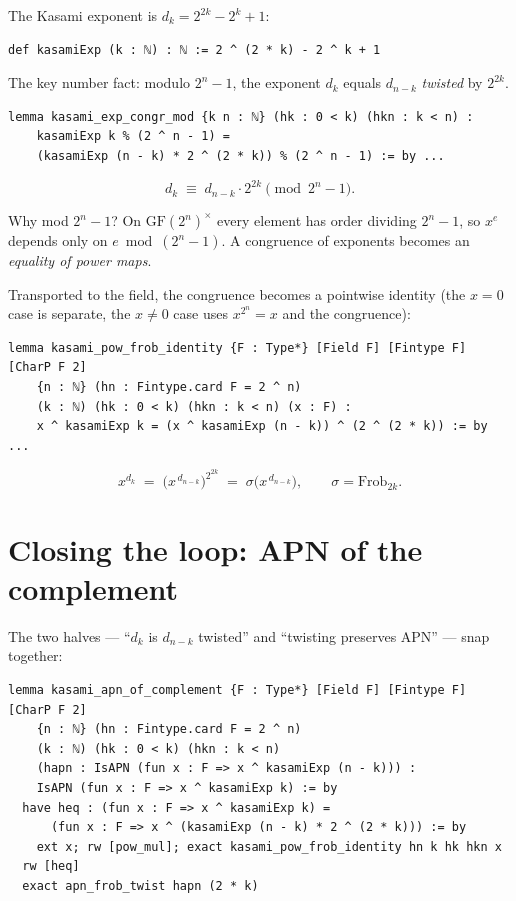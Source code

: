 \documentclass[11pt]{article}
\newcommand{\note}[1]{%
  \par\smallskip
  \noindent\colorbox{leanbg}{\parbox{\dimexpr\linewidth-2\fboxsep}{\small #1}}%
  \par\smallskip}
\begin{document}
The Kasami exponent is $d_k = 2^{2k} - 2^k + 1$:

\begin{lstlisting}
def kasamiExp (k : ℕ) : ℕ := 2 ^ (2 * k) - 2 ^ k + 1
\end{lstlisting}

\noindent
The key number fact: modulo $2^{n}-1$, the exponent $d_k$ equals
$d_{n-k}$ \emph{twisted} by $2^{2k}$.

\begin{lstlisting}
lemma kasami_exp_congr_mod {k n : ℕ} (hk : 0 < k) (hkn : k < n) :
    kasamiExp k % (2 ^ n - 1) =
    (kasamiExp (n - k) * 2 ^ (2 * k)) % (2 ^ n - 1) := by ...
\end{lstlisting}

\[
d_k \;\equiv\; d_{n-k}\cdot 2^{2k} \pmod{2^{n}-1}.
\]

\note{Why mod $2^{n}-1$? On $\mathrm{GF}(2^{n})^{\times}$ every element has order
dividing $2^{n}-1$, so $x^{e}$ depends only on $e \bmod (2^{n}-1)$.
A congruence of exponents becomes an \emph{equality of power maps}.}

\bigskip
\noindent
Transported to the field, the congruence becomes a pointwise identity
(the $x=0$ case is separate, the $x\ne 0$ case uses
$x^{2^{n}}=x$ and the congruence):

\begin{lstlisting}
lemma kasami_pow_frob_identity {F : Type*} [Field F] [Fintype F] [CharP F 2]
    {n : ℕ} (hn : Fintype.card F = 2 ^ n)
    (k : ℕ) (hk : 0 < k) (hkn : k < n) (x : F) :
    x ^ kasamiExp k = (x ^ kasamiExp (n - k)) ^ (2 ^ (2 * k)) := by ...
\end{lstlisting}

\[
x^{d_k} \;=\; \bigl(x^{\,d_{n-k}}\bigr)^{2^{2k}}
\;=\;
σ\bigl(x^{\,d_{n-k}}\bigr),\qquad σ = \text{Frob}_{2k}.
\]

\bigskip

\section{Closing the loop: APN of the complement}

The two halves --- ``$d_k$ is $d_{n-k}$ twisted'' and ``twisting preserves
APN'' --- snap together:

\begin{lstlisting}
lemma kasami_apn_of_complement {F : Type*} [Field F] [Fintype F] [CharP F 2]
    {n : ℕ} (hn : Fintype.card F = 2 ^ n)
    (k : ℕ) (hk : 0 < k) (hkn : k < n)
    (hapn : IsAPN (fun x : F => x ^ kasamiExp (n - k))) :
    IsAPN (fun x : F => x ^ kasamiExp k) := by
  have heq : (fun x : F => x ^ kasamiExp k) =
      (fun x : F => x ^ (kasamiExp (n - k) * 2 ^ (2 * k))) := by
    ext x; rw [pow_mul]; exact kasami_pow_frob_identity hn k hk hkn x
  rw [heq]
  exact apn_frob_twist hapn (2 * k)
\end{lstlisting}
\end{document}
